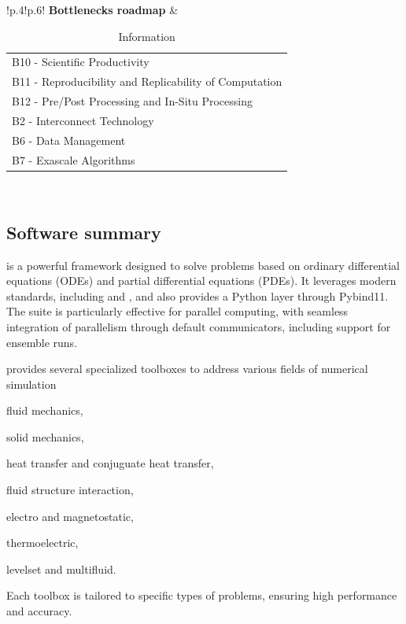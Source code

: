 \begin{table}[!ht]
{{\begin{tabular}{!{\color{numpexgray}\vrule}p{.4\textwidth}!{\color{numpexgray}\vrule}p{.6\textwidth}!{\color{numpexgray}\vrule}}
        \textbf{Bottlenecks roadmap} & \begin{tabular}{l}
B10 - Scientific Productivity\\
B11 - Reproducibility and Replicability of Computation\\
B12 - Pre/Post Processing and In-Situ Processing\\
B2 - Interconnect Technology\\
B6 - Data Management\\
B7 - Exascale Algorithms\\
\end{tabular} \\
        \hline
    \end{tabular}
    }}
    \caption{\Feelpp Information}
\end{table}

\subsection{Software summary}
\label{sec:Feelpp:summary}

\Feelpp is a powerful framework designed to solve problems based on ordinary differential equations (ODEs) and partial differential equations (PDEs).
It leverages modern \Cpp{} standards, including  and , and also provides a Python layer through Pybind11.
The suite is particularly effective for parallel computing, with seamless integration of parallelism through default communicators, including support for ensemble runs.



\Feelpp provides several specialized toolboxes to address various fields of numerical simulation
\begin{inparaenum}[(i)]
        \item fluid mechanics,
        \item solid mechanics,
        \item heat transfer and conjuguate heat transfer,
        \item fluid structure interaction,
        \item electro and magnetostatic,
        \item thermoelectric,
        \item levelset and multifluid.
\end{inparaenum}
Each toolbox is tailored to specific types of problems, ensuring high performance and accuracy.

